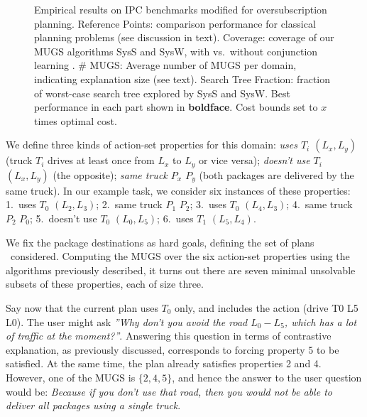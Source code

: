 \setlength{\tabcolsep}{2pt}
\renewcommand{\arraystretch}{0.8}
\begin{figure*}[h!]
	\tiny
	\centering  
        \vspace{-0.2cm}
	\caption{Empirical results on IPC benchmarks modified for oversubscription planning. Reference Points: comparison performance for classical planning problems (see discussion in text). Coverage: coverage of our MUGS algorithms SysS and SysW, with vs.\ without conjunction learning \hc. \# MUGS: Average number of MUGS per domain, indicating explanation size (see text). Search Tree Fraction: fraction of worst-case search tree explored by SysS and SysW. Best performance in each part shown in \textbf{boldface}. Cost bounds set to $x$ times optimal cost.}
	\label{table:coverage_ipc}
        \vspace{-0.4cm}
\end{figure*}

We define three kinds of action-set properties for this domain:
\emph{uses $T_i$ $(L_x,L_y)$} (truck $T_i$ drives at least once from
$L_x$ to $L_y$ or vice versa); \emph{doesn't use $T_i$ $(L_x,L_y)$}
(the opposite); \emph{same truck $P_x$ $P_y$} (both packages are
delivered by the same truck). In our example task, we consider six
instances of these properties: 1.\ uses $T_0$ $(L_2,L_3)$; 2.\ same
truck $P_1$ $P_2$; 3.\ uses $T_0$ $(L_4,L_3)$; 4.\ same truck $P_2$
$P_0$; 5.\ doesn't use $T_0$ $(L_0,L_5)$; 6.\ uses $T_1$ $(L_5,L_4)$.

We fix the package destinations as hard goals, defining the set of
plans \plans\ considered. Computing the MUGS over the six action-set
properties using the algorithms previously described, it turns out
there are seven minimal unsolvable subsets of these properties, each
of size three.

Say now that the current plan uses $T_0$ only, and includes the action
(drive T0 L5 L0). The user might ask \emph{''Why don't you avoid the
  road $L_0-L_5$, which has a lot of traffic at the
  moment?''}. Answering this question in terms of contrastive
explanation, as previously discussed, corresponds to forcing property
5 to be satisfied. At the same time, the plan already satisfies
properties 2 and 4. However, one of the MUGS is $\{2,4,5\}$, and hence
the answer to the user question would be: \textit{Because if you don't
  use that road, then you would not be able to deliver all packages
  using a single truck}.
